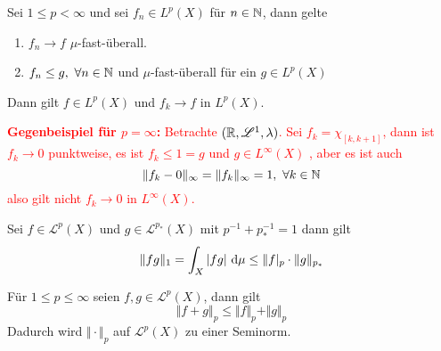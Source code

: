 \documentclass{scrartcl}
\begin{document}
    \begin{bem} Sei $1\le p<\infty$ und sei 
        $f_n\in L^p(X)$ für $n\in \mathbb{N}$, dann gelte
        \begin{enumerate}
            \item $f_n \to f$ $\mu$-fast-überall. 
            \item $f_n \le g, \ \forall n\in \mathbb{N}$ und $\mu$-fast-überall für ein $g\in L^p(X)$
        \end{enumerate}
        Dann gilt $f\in L^p(X)$ und $f_k \to f$ in $L^p(X)$.
    \end{bem}
    \textcolor{red}{\textbf{Gegenbeispiel für $p=\infty$:} Betrachte $(\mathbb{R}, \mathscr{L}^1, \lambda)$. Sei $f_k=\chi_{[k,k+1]}$, dann ist $f_k\to 0$ punktweise, es ist $f_k\le 1=g$ und $g\in L^\infty(X)$
    , aber es ist auch 
    \[
    \Vert f_k - 0\Vert_\infty = \Vert f_k\Vert_\infty = 1, \ \forall k\in \mathbb{N}    
    \]
    also gilt nicht $f_k\to 0$ in $L^\infty(X)$.}
    \begin{lemma} Sei $f\in \mathscr{L}^p(X)$ und $g\in\mathscr{L}^{p_*}(X)$ mit $p^{-1}+p_*^{-1}=1$ 
        dann gilt 
        \[
        \Vert fg\Vert_1 = \int_X \vert fg\vert \ \mathrm{d} \mu \le \Vert f\vert_p \cdot \Vert g\Vert_{p_*}     
        \]
    \end{lemma}
    \begin{lemma} Für $1\le p\le \infty$ seien $f,g\in \mathscr{L}^p(X)$, dann gilt 
        \[
        \Vert f+g\Vert_p \le \Vert f\Vert_p + \Vert g\Vert_p    
        \]
        Dadurch wird $\Vert\cdot\Vert_p$ auf $\mathscr{L}^p(X)$ zu einer Seminorm.
    \end{lemma}
\end{document}
